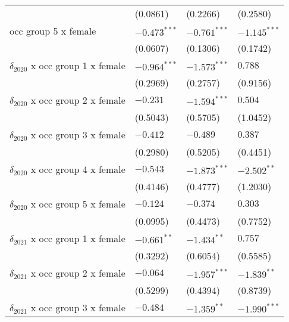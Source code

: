 \begin{tabular}{llll}
                                       &           (0.0861) &           (0.2266) &           (0.2580) \\
occ group 5 x female                   &     $-0.473^{***}$ &     $-0.761^{***}$ &     $-1.145^{***}$ \\
                                       &           (0.0607) &           (0.1306) &           (0.1742) \\
$\delta_{2020}$ x occ group 1 x female &     $-0.964^{***}$ &     $-1.573^{***}$ &            $0.788$ \\
                                       &           (0.2969) &           (0.2757) &           (0.9156) \\
$\delta_{2020}$ x occ group 2 x female &           $-0.231$ &     $-1.594^{***}$ &            $0.504$ \\
                                       &           (0.5043) &           (0.5705) &           (1.0452) \\
$\delta_{2020}$ x occ group 3 x female &           $-0.412$ &           $-0.489$ &            $0.387$ \\
                                       &           (0.2980) &           (0.5205) &           (0.4451) \\
$\delta_{2020}$ x occ group 4 x female &           $-0.543$ &     $-1.873^{***}$ &      $-2.502^{**}$ \\
                                       &           (0.4146) &           (0.4777) &           (1.2030) \\
$\delta_{2020}$ x occ group 5 x female &           $-0.124$ &           $-0.374$ &            $0.303$ \\
                                       &           (0.0995) &           (0.4473) &           (0.7752) \\
$\delta_{2021}$ x occ group 1 x female &      $-0.661^{**}$ &      $-1.434^{**}$ &            $0.757$ \\
                                       &           (0.3292) &           (0.6054) &           (0.5585) \\
$\delta_{2021}$ x occ group 2 x female &           $-0.064$ &     $-1.957^{***}$ &      $-1.839^{**}$ \\
                                       &           (0.5299) &           (0.4394) &           (0.8739) \\
$\delta_{2021}$ x occ group 3 x female &           $-0.484$ &      $-1.359^{**}$ &     $-1.990^{***}$ \\

\end{tabular}
